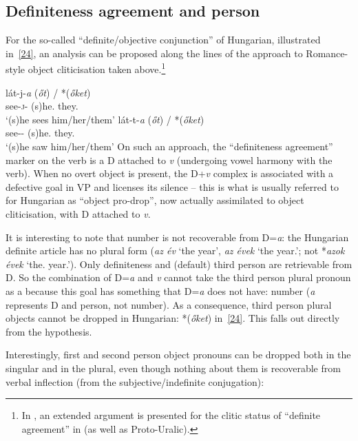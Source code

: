 \documentclass[output=paper]{langsci/langscibook}
\begin{document}
\begin{refcontext}
\section{Definiteness agreement and person}
\label{sec:16.5}

For the so-called \enquote{definite/objective conjunction} of Hungarian, illustrated
in~\eqref{24}, an analysis can be proposed along the lines of the approach to
Romance-style object cliticisation taken above.\footnote{In 
    \citet{dikkenkeneseifs}, an extended argument is presented for the clitic
    status of \enquote{definite agreement} in  (as well as Proto-Uralic).}

\ea \label{24}
    \ea \gll l\'at-j-\emph{a} (\emph{\H{o}t}) / *(\emph{\H{o}ket})\\
    see-\textsc{j}-\Def{} (s)he.\Acc{} {} \phantom{*(}they.\Acc{}\\
    \glt \enquote*{(s)he sees him/her/them}
     \ex \gll   l\'at-t-\emph{a} (\emph{\H{o}t}) / *(\emph{\H{o}ket})\\
    see-\Pst-\Def{} (s)he.\Acc{} {} \phantom{*(}they.\Acc{}\\
    \glt \enquote*{(s)he saw him/her/them}
    \z
\z
On such an approach, the \enquote{definiteness agreement} marker on the verb is a D
attached to \emph{v} (undergoing vowel harmony with the verb). When no overt
object is present, the D+\emph{v} complex is associated with a defective goal
in VP and licenses its silence -- this is what is usually referred to for
Hungarian as \enquote{object pro-drop}, now actually assimilated to object
cliticisation, with D attached to \emph{v}.

It is interesting to note that number is not recoverable from D=\emph{a}: the
Hungarian definite article has no plural form (\emph{az \'ev} \enquote*{the year},
\emph{az \'evek} \enquote*{the year.\Pl{}}; not *\emph{azok \'evek}
\enquote*{the.\Pl{} year.\Pl{}}).  Only definiteness and (default) third
person are retrievable from D. So the combination of D=\emph{a} and \emph{v}
cannot take the third person plural pronoun as a  because this
goal has something that D=\emph{a} does not have: number (\emph{a} represents D
and person, not number). As a consequence, third person plural objects cannot
be dropped in Hungarian: *(\emph{\H{o}ket}) in~\eqref{24}. This falls out
directly from the  hypothesis.

Interestingly, first and second person object pronouns can be dropped both in
the singular and in the plural, even though nothing about them is recoverable
from verbal inflection (from the subjective/indefinite conjugation):


\end{refcontext}
\end{document}

